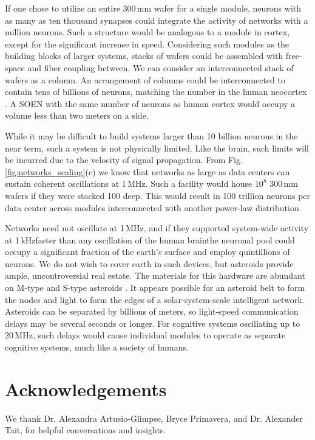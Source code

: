 \documentclass[twocolumn]{article}
\begin{document}
If one chose to utilize an entire 300\,mm wafer for a single module, neurons with as many as ten thousand synapses could integrate the activity of networks with a million neurons. Such a structure would be analogous to a module in cortex, except for the significant increase in speed. Considering such modules as the building blocks of larger systems, stacks of wafers could be assembled with free-space and fiber coupling between. We can consider an interconnected stack of wafers as a column. An arrangement of columns could be interconnected to contain tens of billions of neurons, matching the number in the human neocortex \cite{brsc1998,he2009}. A SOEN with the same number of neurons as human cortex would occupy a volume less than two meters on a side. 

While it may be difficult to build systems larger than 10 billion neurons in the near term, such a system is not physically limited. Like the brain, such limits will be incurred due to the velocity of signal propagation. From Fig. \ref{fig:networks_scaling}(c) we know that networks as large as data centers can sustain coherent oscillations at 1\,MHz. Such a facility would house $10^8$ 300\,mm wafers if they were stacked 100 deep. This would result in 100 trillion neurons per data center across modules interconnected with another power-law distribution. 

Networks need not oscillate at 1\,MHz, and if they supported system-wide activity at 1\,kHz\textemdash faster than any oscillation of the human brain\textemdash the neuronal pool could occupy a significant fraction of the earth's surface and employ quintillions of neurons. We do not wish to cover earth in such devices, but asteroids provide ample, uncontroversial real estate. The materials for this hardware are abundant on M-type and S-type asteroids \cite{mufo2017,astra,bu1999,shcl2010,necl2014}. It appears possible for an asteroid belt to form the nodes and light to form the edges of a solar-system-scale intelligent network. Asteroids can be separated by billions of meters, so light-speed communication delays may be several seconds or longer. For cognitive systems oscillating up to 20\,MHz, such delays would cause individual modules to operate as separate cognitive systems, much like a society of humans. 

\section{Acknowledgements}
We thank Dr. Alexandra Artusio-Glimpse, Bryce Primavera, and Dr. Alexander Tait, for helpful conversations and insights.
\end{document}
